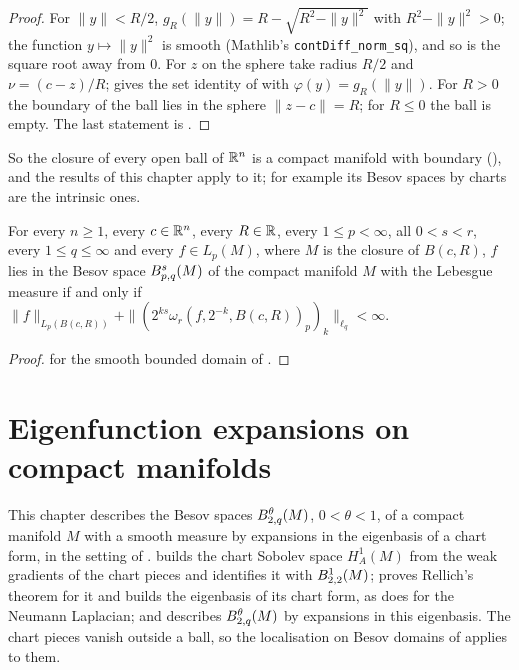 \begin{proof}
\leanok
For $\|y\| < R/2$, $g_R(\|y\|) = R - \sqrt{R^2 - \|y\|^2}$ with $R^2 - \|y\|^2 > 0$; the function
$y \mapsto \|y\|^2$ is smooth (Mathlib's \texttt{contDiff\_\allowbreak norm\_\allowbreak sq}), and
so is the square root away from $0$. For $z$ on the sphere take radius $R/2$ and
$\nu = (c - z)/R$;  gives the set identity of
 with $\varphi(y) = g_R(\|y\|)$. For $R > 0$ the boundary of the ball
lies in the sphere $\|z - c\| = R$; for $R \leq 0$ the ball is empty. The last statement is
.
\end{proof}

So the closure of every open ball of $\mathbb{R}^n$ is a compact manifold with boundary
(), and the results of this chapter apply to it; for example its
Besov spaces by charts are the intrinsic ones.

\begin{corollary}
\label{cor:ball-besov}
\leanok
{}
For every $n \geq 1$, every $c \in \mathbb{R}^n$, every $R \in \mathbb{R}$, every $1 \leq p < \infty$, all
$0 < s < r$, every $1 \leq q \leq \infty$ and every $f \in L_p(M)$, where $M$ is the closure of
$B(c, R)$, $f$ lies in the Besov space $B^{s}_{p,q}(M)$ of the compact manifold $M$ with the
Lebesgue measure if and only if
$\|f\|_{L_p(B(c, R))} + \|(2^{ks} \omega_r(f, 2^{-k}, B(c, R))_p)_k\|_{\ell_q} < \infty$.
\end{corollary}

\begin{proof}
\leanok
{} for the smooth bounded domain of .
\end{proof}

\chapter{Eigenfunction expansions on compact manifolds}
\label{ch:manifold-eigenbases}

This chapter describes the Besov spaces $B^{\theta}_{2,q}(M)$, $0 < \theta < 1$, of a compact
manifold $M$ with a smooth measure by expansions in the eigenbasis of a chart form, in the setting
of .  builds the chart Sobolev space $H^1_A(M)$ from
the weak gradients of the chart pieces and identifies it with $B^{1}_{2,2}(M)$;
 proves Rellich's theorem for it and builds the eigenbasis of its chart
form, as  does for the Neumann Laplacian; and
 describes $B^{\theta}_{2,q}(M)$ by expansions in this
eigenbasis. The chart pieces vanish outside a ball, so the localisation on Besov domains of
 applies to them.

